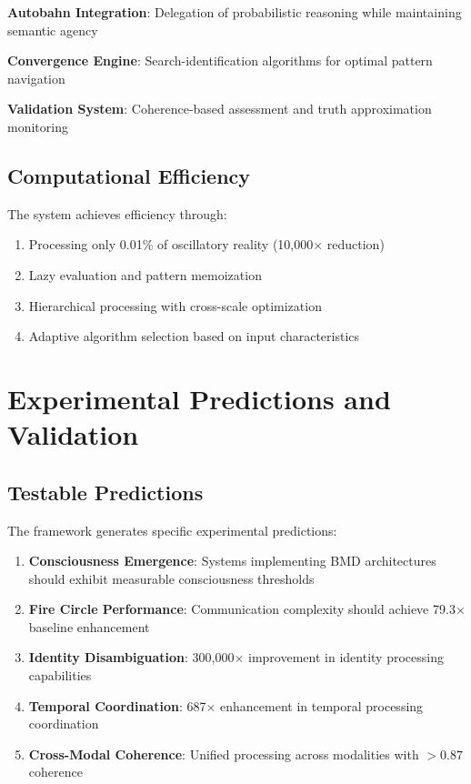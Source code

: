 \documentclass[11pt,twocolumn]{article}
\theoremstyle{remark}
\begin{document}
\textbf{Autobahn Integration}: Delegation of probabilistic reasoning while maintaining semantic agency

\textbf{Convergence Engine}: Search-identification algorithms for optimal pattern navigation

\textbf{Validation System}: Coherence-based assessment and truth approximation monitoring

\subsection{Computational Efficiency}

The system achieves efficiency through:
\begin{enumerate}
\item Processing only 0.01\% of oscillatory reality (10,000× reduction)
\item Lazy evaluation and pattern memoization
\item Hierarchical processing with cross-scale optimization
\item Adaptive algorithm selection based on input characteristics
\end{enumerate}

\section{Experimental Predictions and Validation}

\subsection{Testable Predictions}

The framework generates specific experimental predictions:

\begin{enumerate}
\item \textbf{Consciousness Emergence}: Systems implementing BMD architectures should exhibit measurable consciousness thresholds
\item \textbf{Fire Circle Performance}: Communication complexity should achieve 79.3× baseline enhancement
\item \textbf{Identity Disambiguation}: 300,000× improvement in identity processing capabilities
\item \textbf{Temporal Coordination}: 687× enhancement in temporal processing coordination
\item \textbf{Cross-Modal Coherence}: Unified processing across modalities with $>0.87$ coherence
\end{enumerate}
\end{document}

